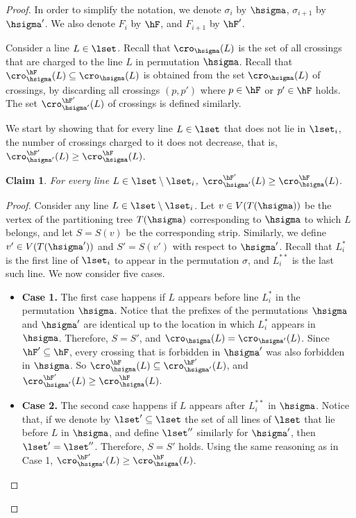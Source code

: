\documentclass[11pt]{article}
\numberwithin{equation}{section}
\newtheorem{claim}[theorem]{Claim}
\theoremstyle{definition}
\theoremstyle{plain}
\begin{document}
\begin{proof}
	In order to simplify the notation, we denote $\sigma_i$ by $\hsigma$, $\sigma_{i+1}$ by $\hsigma'$. We also denote $F_i$ by $\hF$, and $F_{i+1}$ by $\hF'$.
	
	
	Consider a line $L\in \lset$. Recall that $\cro_{\hsigma}(L)$ is the set of all crossings that are charged to the line $L$ in permutation $\hsigma$. Recall that $\cro^{\hF}_{\hsigma}(L)\subseteq \cro_{\hsigma}(L)$ is obtained from the set  $\cro_{\hsigma}(L)$ of crossings, by discarding all crossings $(p,p')$ where $p\in \hF$ or $p'\in \hF$ holds. The set $\cro^{\hF'}_{\hsigma'}(L)$ of crossings is defined similarly.
	
	We start by showing that for every line $L\in \lset$ that does not lie in $\lset_i$, the number of crossings charged to it does not decrease, that is, $\cro^{\hF'}_{\hsigma'}(L)\geq\cro^{\hF}_{\hsigma}(L)$.
	
	\begin{claim}\label{claim: lines outside of block do not change}
		For every line $L\in \lset\setminus \lset_i$, $\cro^{\hF'}_{\hsigma'}(L)\geq\cro^{\hF}_{\hsigma}(L)$.
	\end{claim}
	\begin{proof}
		Consider any line $L\in \lset\setminus \lset_i$. Let $v\in V(T({\hsigma}))$ be the vertex of the partitioning tree $T({\hsigma})$ corresponding to $\hsigma$ to which $L$ belongs, and let $S=S(v)$ be the corresponding strip. Similarly, we define $v'\in V(T({\hsigma'}))$ and $S'=S(v')$ with respect to $\hsigma'$.  
		Recall that $L^*_i$ is the first line of $\lset_i$ to appear in the permutation $\sigma$, and $L^{**}_i$ is the last such line. We now consider five cases.
		\begin{itemize}
		    \item 	{\bf Case 1.}	The first case happens if $L$ appears before line $L^*_i$ in the permutation $\hsigma$. Notice that the prefixes of the permutations $\hsigma$ and $\hsigma'$ are identical up to the location in which $L^*_i$ appears in $\hsigma$. Therefore, $S=S'$, and $\cro_{\hsigma}(L)=\cro_{\hsigma'}(L)$. Since $\hF'\subseteq \hF$, every crossing that is forbidden in $\hsigma'$ was also forbidden in $\hsigma$. So $\cro_{\hsigma}^{\hF}(L)\subseteq \cro_{\hsigma'}^{\hF'}(L)$, and $\cro^{\hF'}_{\hsigma'}(L)\geq\cro^{\hF}_{\hsigma}(L)$.
		    
		    \item 	{\bf Case 2.} The second case happens if $L$ appears after $L^{**}_i$ in $\hsigma$. Notice that, if we denote by $\lset'\subseteq \lset$ the set of all lines of $\lset$ that lie before $L$ in $\hsigma$, and define $\lset''$ similarly for $\hsigma'$, then $ \lset'=\lset''$. Therefore, $S=S'$ holds. Using the same reasoning as in Case 1,  $\cro^{\hF'}_{\hsigma'}(L)\geq\cro^{\hF}_{\hsigma}(L)$.
		    

\end{itemize}
\end{proof}
\end{proof}
\end{document}
